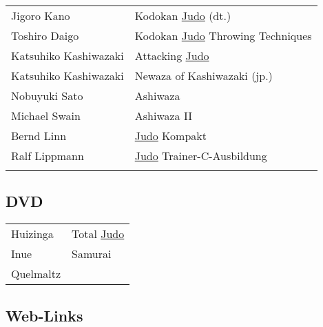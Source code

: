 \documentclass[justified, a4paper, notitlepage, captions=tableheading, nobib]{tufte-handout}
\begin{document}
\begin{center}
\begin{tabular}{ll}
Jigoro Kano & Kodokan \hyperref[org4f88021]{Judo} (dt.)\\
Toshiro Daigo & Kodokan \hyperref[org4f88021]{Judo} Throwing Techniques\\
Katsuhiko Kashiwazaki & Attacking \hyperref[org4f88021]{Judo}\\
Katsuhiko Kashiwazaki & Newaza of Kashiwazaki (jp.)\\
Nobuyuki Sato & Ashiwaza\\
Michael Swain & Ashiwaza II\\
Bernd Linn & \hyperref[org4f88021]{Judo} Kompakt\\
Ralf Lippmann & \hyperref[org4f88021]{Judo} Trainer-C-Ausbildung\\
 & \\
\end{tabular}
\end{center}

\subsection{DVD}
\label{sec:orgc87027d}

\begin{center}
\begin{tabular}{ll}
Huizinga & Total \hyperref[org4f88021]{Judo}\\
Inue & Samurai\\
Quelmaltz & \\
\end{tabular}
\end{center}

\subsection{Web-Links}
\label{sec:org056faf1}
\end{document}
